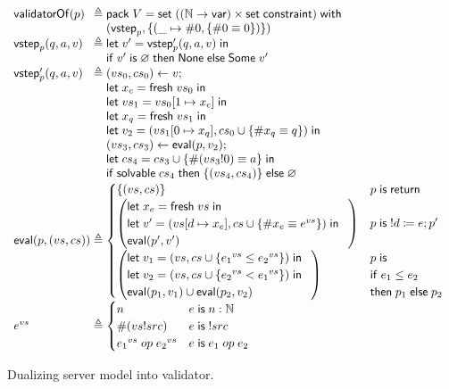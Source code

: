 \begin{figure}
\[\begin{array}{l@{\;}r@{\;}l}
\validatorOf(p)&\triangleq&\existT{V}{\Set((\Nat\to\Var)\times\Set\constraint)}{\\
  &&(\vstep_p,\{(\_\mapsto\#0,\{\#0\equiv0\})\})}\\
\vstep_p(q,a,v)&\triangleq&\letin{v'}{\vstep'_p(q,a,v)}\\
&&\If v'\Is\varnothing\Then\None\Else\Some v'\\
\vstep'_p(q,a,v)&\triangleq&(vs_0,cs_0)\gets v;\\
&&\letin{x_c}{\Fresh vs_0}\\
&&\letin{vs_1}{\update{vs_0}{1}{x_c}}\\
&&\letin{x_q}{\Fresh vs_1}\\
&&\letin{v_2}{(\update{vs_1}{0}{x_q},cs_0\cup\{\#x_q\equiv q\})}\\
&&(vs_3,cs_3)\gets\Eval(p,v_2);\\
&&\letin{cs_4}{cs_3\cup\{\#(vs_3!0)\equiv a\}}\\
&&\If\solvable cs_4\Then\{(vs_4,cs_4)\}\Else\varnothing\\
\Eval(p,(vs,cs))&\triangleq&\begin{cases}
  \{(vs,cs)\}&p\Is\Return\\
  \left(\begin{array}{@{}l}
    \letin{x_e}{\Fresh vs}\\
    \letin{v'}{(\update{vs}{d}{x_e},cs\cup\{\#x_e\equiv e^{vs}\})}\\
    \Eval(p',v')
  \end{array}\right)&p\Is !d\coloneqq e;p'\\
  \left(\begin{array}{@{}l}
    \letin{v_1}{(vs,cs\cup\{{e_1}^{vs}\le{e_2}^{vs}\})}\\
    \letin{v_2}{(vs,cs\cup\{{e_2}^{vs}<{e_1}^{vs}\})}\\
    \Eval(p_1,v_1)\cup\Eval(p_2,v_2)
  \end{array}\right)&\begin{array}{@{}l}p\Is\\
    \If e_1\le e_2\\
    \tthen p_1\Else p_2\end{array}
\end{cases}\\
e^{vs}&\triangleq&\begin{cases}
  n&e\Is n:\Nat\\
  \#(vs!src)&e\Is!src\\
  {e_1}^{vs}\;op\;{e_2}^{vs}&e\Is e_1\;op\;e_2
\end{cases}
\end{array}\]
\caption[Dualizing server model into validator]{Dualizing server model into
  validator.  }
\label{fig:dualize}
\end{figure}



